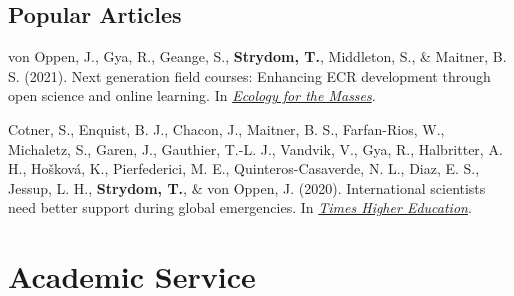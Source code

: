 \documentclass[11pt, a4paper]{awesome-cv}
\begin{document}
\begin{cventries}
    \vspace{-4.0mm}
\end{cventries}
\vspace{\baselineskip}

\hypertarget{popular-articles}{%
\subsection{\texorpdfstring{\textbf{Popular
Articles}}{Popular Articles}}\label{popular-articles}}

\begingroup
\setlength{\parindent}{-0.5in}
\setlength{\leftskip}{0.5in}

\hypertarget{refs_popular}{}
\leavevmode{}%
von Oppen, J., Gya, R., Geange, S., \textbf{Strydom, T.}, Middleton, S.,
\& Maitner, B. S. (2021). Next generation field courses: Enhancing ECR
development through open science and online learning. In
\emph{\href{https://ecologyforthemasses.com/2021/03/08/next-generation-field-courses-enhancing-ecr-development-through-open-science-and-online-learning/}{Ecology
for the Masses}}.

\leavevmode{}%
Cotner, S., Enquist, B. J., Chacon, J., Maitner, B. S., Farfan-Rios, W.,
Michaletz, S., Garen, J., Gauthier, T.-L. J., Vandvik, V., Gya, R.,
Halbritter, A. H., Hošková, K., Pierfederici, M. E.,
Quinteros-Casaverde, N. L., Diaz, E. S., Jessup, L. H.,
\textbf{Strydom, T.}, \& von Oppen, J. (2020). International scientists
need better support during global emergencies. In
\emph{\href{https://tinyurl.com/y5ccw9nb}{Times Higher Education}}.

\endgroup

\newpage

\hypertarget{academic-service}{%
\section{Academic Service}\label{academic-service}}

\begin{cventries}
    \vspace{-4.0mm}
    \vspace{-4.0mm}
    \vspace{-4.0mm}
\end{cventries}
\end{document}
